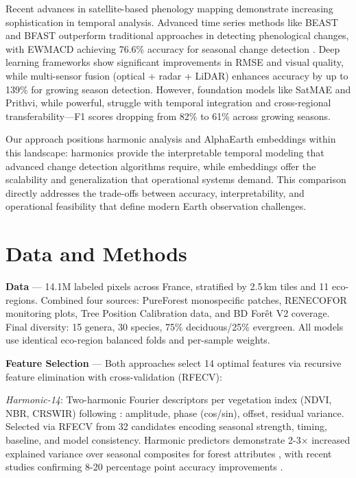 \documentclass[utf8]{FrontiersinHarvard}
\begin{document}
Recent advances in satellite-based phenology mapping demonstrate increasing sophistication in temporal analysis. Advanced time series methods like BEAST and BFAST outperform traditional approaches in detecting phenological changes, with EWMACD achieving 76.6\% accuracy for seasonal change detection \citep{Zhao2019}. Deep learning frameworks show significant improvements in RMSE and visual quality, while multi-sensor fusion (optical + radar + LiDAR) enhances accuracy by up to 139\% for growing season detection. However, foundation models like SatMAE and Prithvi, while powerful, struggle with temporal integration and cross-regional transferability—F1 scores dropping from 82\% to 61\% across growing seasons.

Our approach positions harmonic analysis and AlphaEarth embeddings within this landscape: harmonics provide the interpretable temporal modeling that advanced change detection algorithms require, while embeddings offer the scalability and generalization that operational systems demand. This comparison directly addresses the trade-offs between accuracy, interpretability, and operational feasibility that define modern Earth observation challenges.

\section{Data and Methods}
\textbf{Data} — 14.1M labeled pixels across France, stratified by 2.5\,km tiles and 11 eco-regions. Combined four sources: PureForest monospecific patches, RENECOFOR monitoring plots, Tree Position Calibration data, and BD Forêt V2 coverage. Final diversity: 15 genera, 30 species, 75\% deciduous/25\% evergreen. All models use identical eco-region balanced folds and per-sample weights.

\textbf{Feature Selection} — Both approaches select 14 optimal features via recursive feature elimination with cross-validation (RFECV):

\emph{Harmonic-14}: Two-harmonic Fourier descriptors per vegetation index (NDVI, NBR, CRSWIR) following \citet{JonssonEklundh2002}: amplitude, phase (cos/sin), offset, residual variance. Selected via RFECV from 32 candidates encoding seasonal strength, timing, baseline, and model consistency. Harmonic predictors demonstrate 2-3× increased explained variance over seasonal composites for forest attributes \citep{Wilson2018}, with recent studies confirming 8-20 percentage point accuracy improvements \citep{Francini2024}.
\end{document}
